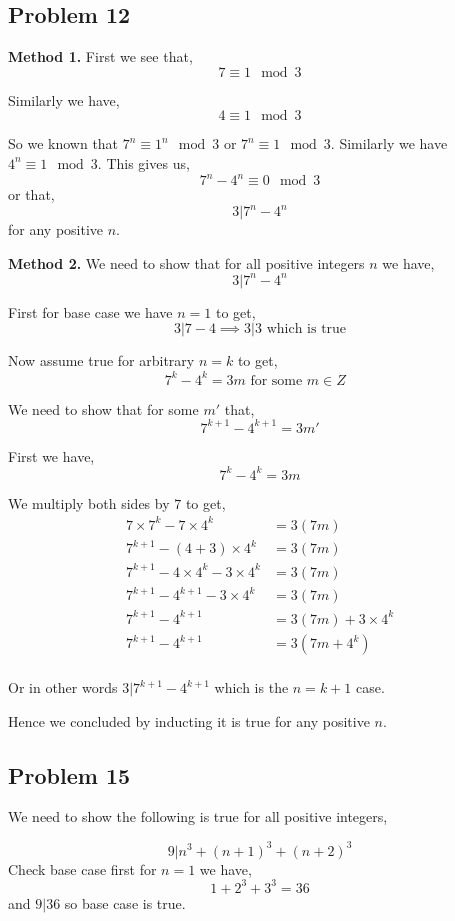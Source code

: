 \documentclass[a4paper]{report}
\begin{document}
\subsection*{Problem 12}
\textbf{Method 1.}
First we see that, 
$$ 7 \equiv 1 \mod 3 $$ 

Similarly we have, 
$$ 4 \equiv 1 \mod 3 $$ 

So we known that $7^{n} \equiv 1^{n} \mod 3$ or $7^{n} \equiv 1 \mod 3$. Similarly we have $4^{n}\equiv 1 \mod 3$. This  gives us, 
$$ 7^{n} - 4^{n} \equiv 0 \mod 3 $$  or that, 
$$ 3 | 7^{n} - 4^{n} $$  for any positive $n$.


\textbf{Method 2.}
We need to show that for all positive integers $n$ we have, 
$$ 3 | 7^{n} - 4^{n} $$ 

First for base case we have $n = 1$ to get, 
$$ 3 | 7 - 4 \implies 3 | 3  \text{ which is true}$$ 

Now assume true for arbitrary $n = k$ to get, 
$$ 7^{k} - 4^{k} = 3m \text{ for some $m \in Z$ }$$ 

We need to show that for some $m'$ that, 
$$ 7^{k + 1} - 4^{k + 1} = 3m' $$ 

First we have, 
$$ 7^{k} - 4^{k} = 3m$$

We multiply both sides by $7$ to get, 
\begin{align*}
    7 \times  7^{k} - 7 \times  4^{k} &= 3(7m)\\
     7^{k + 1} - (4 + 3) \times  4^{k} &= 3(7m)\\
     7^{k + 1} - 4  \times  4^{k} - 3 \times 4^{k} &= 3(7m)\\
     7^{k + 1} -4^{k + 1} - 3 \times 4^{k} &= 3(7m)\\
     7^{k + 1} - 4^{k + 1}  &= 3(7m) + 3 \times 4^{k}\\
     7^{k + 1} - 4^{k + 1}  &= 3(7m + 4^{k})\\
\end{align*}

Or in other words $3 | 7^{k + 1} - 4^{k + 1}$  which is the $n = k + 1$ case.

Hence we concluded by inducting it is true for any positive $n$.
\subsection*{Problem 15}
We need to show the following is true for all positive integers, 

$$ 9 | n^{3} + (n + 1)^{3} + (n + 2)^{3} $$ 
Check base case first for $n = 1$ we have, 
$$ 1 + 2^{3} + 3^{3} = 36 $$  and $9 | 36$ so base case is true.
\end{document}
